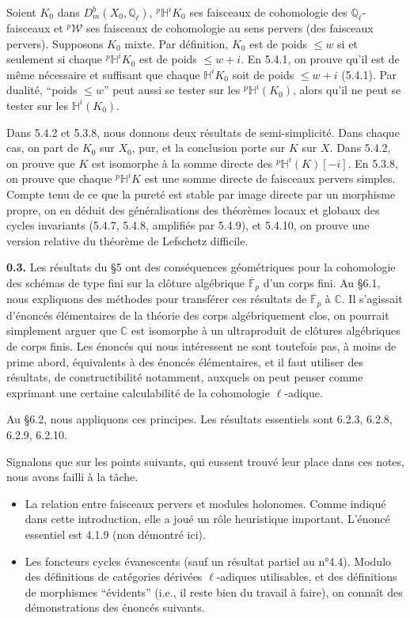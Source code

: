 \documentclass[12pt,a4paper]{article}
\theoremstyle{plain}
\theoremstyle{definition}
\theoremstyle{remark}
\newcommand{\HH}{\mathbb{H}}
\newcommand{\CC}{\mathbb{C}}
\newcommand{\QQ}{\mathbb{Q}}
\newcommand{\FF}{\mathbb{F}}
\begin{document}
Soient $K_{0}$ dans $D^{b}_{m}(X_{0}, \QQ_{\ell})$, ${}^{p}\HH^{i}K_{0}$ ses faisceaux de cohomologie des $\QQ_{\ell}$-faisceaux et ${}^{p}\mathcal{W}$ ses faisceaux de cohomologie au sens pervers (des faisceaux pervers). Supposons $K_{0}$ mixte. Par définition, $K_{0}$ est de poids $\leq w$ si et seulement si chaque ${}^{p}\HH^{i}K_{0}$ est de poids $\leq w{+}i$. En 5.4.1, on prouve qu'il est de même nécessaire et suffisant que chaque $\HH^{i}K_{0}$ soit de poids $\leq w{+}i$ (5.4.1). Par dualité, ``poids $\leq w$'' peut aussi se tester sur les ${}^{p}\HH^{i}(K_{0})$, alors qu'il ne peut se tester sur les $\HH^{i}(K_{0})$.

Dans 5.4.2 et 5.3.8, nous donnons deux résultats de semi-simplicité. Dans chaque cas, on part de $K_{0}$ sur $X_{0}$, pur, et la conclusion porte sur $K$ sur $X$. Dans 5.4.2, on prouve que $K$ est isomorphe à la somme directe des ${}^{p}\HH^{i}(K)[-i]$. En 5.3.8, on prouve que chaque ${}^{p}\HH^{i}K$ est une somme directe de faisceaux pervers simples. Compte tenu de ce que la pureté est stable par image directe par un morphisme propre, on en déduit des généralisations des théorèmes locaux et globaux des cycles invariants (5.4.7, 5.4.8, amplifiés par 5.4.9), et 5.4.10, on prouve une version relative du théorème de Lefschetz difficile.

\medskip

\noindent
\textbf{0.3.} Les résultats du §5 ont des conséquences géométriques pour la cohomologie des schémas de type fini sur la clôture algébrique $\overline{\FF}_{p}$ d'un corps fini. Au §6.1, nous expliquons des méthodes pour transférer ces résultats de $\overline{\FF}_{p}$ à $\CC$. Il s'agissait d'énoncés élémentaires de la théorie des corps algébriquement clos, on pourrait simplement arguer que $\CC$ est isomorphe à un ultraproduit de clôtures algébriques de corps finis. Les énoncés qui nous intéressent ne sont toutefois pas, à moins de prime abord, équivalents à des énoncés élémentaires, et il faut utiliser des résultats, de constructibilité notamment, auxquels on peut penser comme exprimant une certaine calculabilité de la cohomologie $\ell$-adique.

Au §6.2, nous appliquons ces principes. Les résultats essentiels sont 6.2.3, 6.2.8, 6.2.9, 6.2.10.

Signalons que sur les points suivants, qui eussent trouvé leur place dans ces notes, nous avons failli à la tâche.

\begin{itemize}
\item La relation entre faisceaux pervers et modules holonomes. Comme indiqué dans cette introduction, elle a joué un rôle heuristique important. L'énoncé essentiel est 4.1.9 (non démontré ici).
\item Les foncteurs cycles évanescents (sauf un résultat partiel au n°4.4). Modulo des définitions de catégories dérivées $\ell$-adiques utilisables, et des définitions de morphismes ``évidents'' (i.e., il reste bien du travail à faire), on connaît des démonstrations des énoncés suivants.
\end{itemize}
\end{document}
